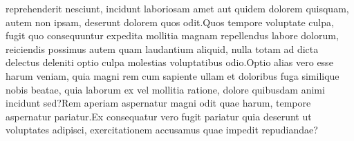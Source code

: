 \documentclass[letterpaper]{article}
\begin{document}
reprehenderit nesciunt, incidunt laboriosam amet aut quidem dolorem quisquam, autem non ipsam, deserunt dolorem quos odit.Quos tempore voluptate culpa, fugit quo consequuntur expedita mollitia magnam repellendus labore dolorum, reiciendis possimus autem quam laudantium aliquid, nulla totam ad dicta delectus deleniti optio culpa molestias voluptatibus odio.Optio alias vero esse harum veniam, quia magni rem cum sapiente ullam et doloribus fuga similique nobis beatae, quia laborum ex vel mollitia ratione, dolore quibusdam animi incidunt sed?Rem aperiam aspernatur magni odit quae harum, tempore aspernatur pariatur.Ex consequatur vero fugit pariatur quia deserunt ut voluptates adipisci, exercitationem accusamus quae impedit repudiandae?\clearpage

\end{document}
